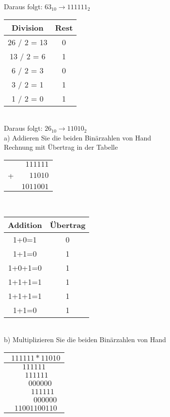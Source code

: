 \documentclass[paper=a4, fontsize=11pt]{scrartcl}
\numberwithin{equation}{section}
\numberwithin{figure}{section}
\numberwithin{table}{section}
\begin{document}
Daraus folgt: $63_{10} \rightarrow 111111_{2}$ \\

  \begin{tabular}{|c|c|}
  \hline
Division & Rest\\
  \hline
26 / 2 = 13 & 0 \\
  \hline
13 / 2 = 6  & 1 \\
  \hline
6 / 2 = 3  & 0 \\
  \hline
3 / 2 = 1  & 1 \\
  \hline
1 / 2 = 0  & 1 \\
  \hline
  \end{tabular} \\
  
  Daraus folgt: $26_{10} \rightarrow 11010_{2}$ \\

a) Addieren Sie die beiden Binärzahlen von Hand \\

Rechnung mit Übertrag in der Tabelle\\

\begin{tabular}{cr}
	&$ 1 1 1 1 1 1$	\\
	+&$  1 1 0 1 0$	\\\hline 
	&$  1 0 1 1 0 0 1$
\end{tabular} \\

  \begin{tabular}{|c|c|}
  \hline
Addition & Übertrag\\
  \hline
1+0=1 & 0 \\
  \hline
1+1=0 & 1 \\
  \hline
1+0+1=0 & 1 \\
  \hline
1+1+1=1 & 1 \\
  \hline
1+1+1=1 & 1 \\
  \hline
1+1=0 & 1 \\
  \hline
  \end{tabular} \\

b) Multiplizieren Sie die beiden Binärzahlen von Hand \\


\begin{tabular}{c}
	$\:\: 1 1 1 1 1 1 *  1 1 0 1 0$ \\\hline
	$111111$\\
	$\:\:\:111111$\\ 
	$\:\:\:\:\:\:\: 000000$\\
	$\:\:\:\:\:\:\:\:\:\: 111111$\\
	$\:\:\:\:\:\:\:\:\:\:\:\:\: 000000$\\\hline
	$\:\: 11001100110$
\end{tabular}
\\
\end{document}
